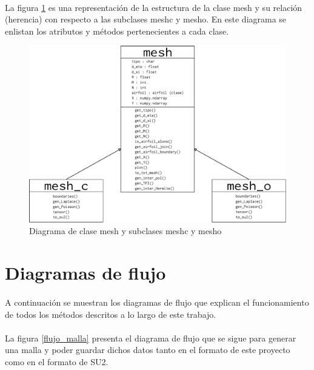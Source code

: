 \documentclass[letterpaper, openright, 12pt]{book}
\begin{document}
    \paragraph*{}
        La figura \ref{mesh_class} es una representación de la estructura de la
        clase mesh y su relación (herencia) con respecto a las subclases
        mesh\textunderscore c y mesh\textunderscore o. En este diagrama se
        enlistan los atributos y métodos pertenecientes a cada clase.
    \begin{figure}
        \centering
        \includegraphics[width=205mm]{./Imagenes/mesh_class}
        \caption{Diagrama de clase mesh y subclases mesh\textunderscore c y
            mesh\textunderscore o}
        \label{mesh_class}
    \end{figure}

    \section{Diagramas de flujo}
    \paragraph*{}
        A continuación se muestran los diagramas de flujo que explican el
        funcionamiento de todos los métodos descritos a lo largo de este
        trabajo.

    \paragraph*{}
        La figura \ref{flujo_malla} presenta el diagrama de flujo que se sigue
        para generar una malla y poder guardar dichos datos tanto en el formato
        de este proyecto como en el formato de SU2.
\end{document}

